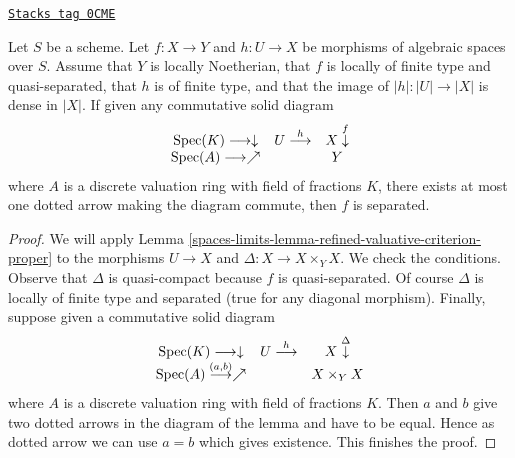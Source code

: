 \begin{lemma}
\label{spaces-limits-lemma-refined-valuative-criterion-separated}
\href{https://stacks.math.columbia.edu/tag/0CME}{\texttt{Stacks tag 0CME}}

Let $S$ be a scheme. Let $f : X \to Y$ and $h : U \to X$ be
morphisms of algebraic spaces over $S$. Assume that $Y$ is
locally Noetherian, that $f$ is locally of finite type and quasi-separated,
that $h$ is of finite type, and that the image of $|h| : |U| \to |X|$
is dense in $|X|$.
If given any commutative solid diagram
$$
\begin{array}{ccc}\operatorname{Spec}(K) \longrightarrow\downarrow & U \overset{h}{\longrightarrow} & X \overset{f}{\downarrow} \\ \operatorname{Spec}(A) \longrightarrow\nearrow &  & Y\end{array}
$$
where $A$ is a discrete valuation ring with field of fractions $K$, there
exists at most one dotted arrow making the diagram commute, then $f$ is
separated.
\end{lemma}

\begin{proof}
We will apply Lemma \ref{spaces-limits-lemma-refined-valuative-criterion-proper}
to the morphisms $U \to X$ and $\Delta : X \to X \times_Y X$.
We check the conditions. Observe that $\Delta$ is quasi-compact because
$f$ is quasi-separated. Of course $\Delta$ is locally of finite type and
separated (true for any diagonal morphism).
Finally, suppose given a commutative solid diagram
$$
\begin{array}{ccc}\operatorname{Spec}(K) \longrightarrow\downarrow & U \overset{h}{\longrightarrow} & X \overset{\Delta}{\downarrow} \\ \operatorname{Spec}(A) \overset{(a, b)}{\longrightarrow}\nearrow &  & X \times_Y X\end{array}
$$
where $A$ is a discrete valuation ring with field of fractions $K$.
Then $a$ and $b$ give two dotted arrows in the diagram of the lemma
and have to be equal. Hence as dotted arrow we can use $a = b$
which gives existence. This finishes the proof.
\end{proof}

